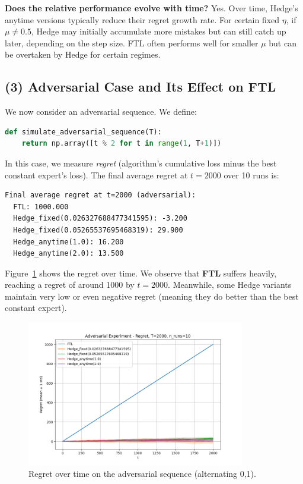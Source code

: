\textbf{Does the relative performance evolve with time?}  
Yes.  Over time, Hedge’s anytime versions typically reduce their regret growth rate.  For certain fixed \(\eta\), if \(\mu\neq0.5\), Hedge may initially accumulate more mistakes but can still catch up later, depending on the step size.  FTL often performs well for smaller \(\mu\) but can be overtaken by Hedge for certain regimes.

\subsection{(3) Adversarial Case and Its Effect on FTL}

We now consider an adversarial sequence.  We define:

\begin{lstlisting}[language=Python, caption={Adversarial sequence alternating 0 and 1.}]
def simulate_adversarial_sequence(T):
    return np.array([t % 2 for t in range(1, T+1)])
\end{lstlisting}

In this case, we measure \emph{regret} (algorithm’s cumulative loss minus the best constant expert’s loss).  The final average regret at \(t=2000\) over 10 runs is:

\begin{verbatim}
Final average regret at t=2000 (adversarial):
  FTL: 1000.000
  Hedge_fixed(0.026327688477341595): -3.200
  Hedge_fixed(0.05265537695468319): 29.900
  Hedge_anytime(1.0): 16.200
  Hedge_anytime(2.0): 13.500
\end{verbatim}

\noindent
Figure~\ref{fig:plot_adversarial} shows the regret over time.  We observe that \textbf{FTL} suffers heavily, reaching a regret of around 1000 by \(t=2000\).  Meanwhile, some Hedge variants maintain very low or even negative regret (meaning they do better than the best constant expert).

\begin{figure}[H]
\centering
\includegraphics[width=0.85\textwidth]{Code/plot_adversarial_example.png}
\caption{Regret over time on the adversarial sequence (alternating 0,1).}
\label{fig:plot_adversarial}
\end{figure}

